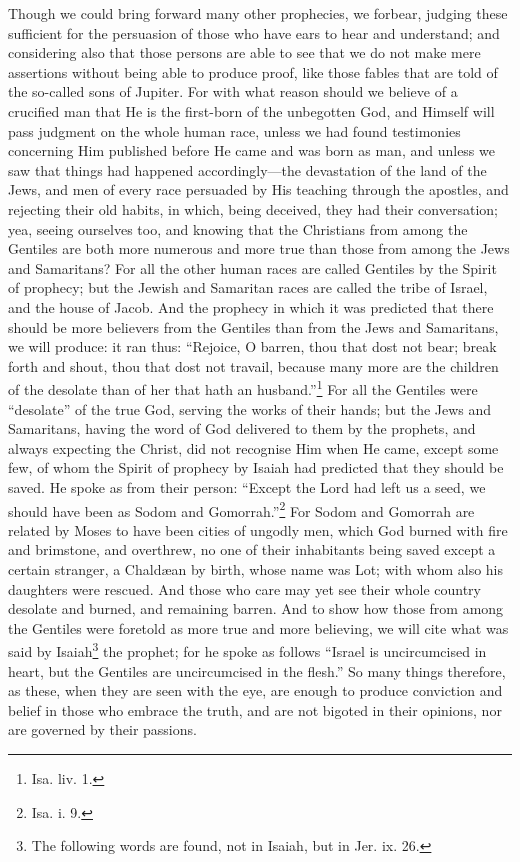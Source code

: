 Though we could bring forward many other prophecies, we forbear, judging these sufficient for the persuasion of those who have ears to hear and understand; and considering also that those persons are able to see that we do not make mere assertions without being able to produce proof, like those fables that are told of the so-called sons of Jupiter. For with what reason should we believe of a crucified man that He is the first-born of the unbegotten God, and Himself will pass judgment on the whole human race, unless we had found testimonies concerning Him published before He came and was born as man, and unless we saw that things had happened accordingly—the devastation of the land of the Jews, and men of every race persuaded by His teaching through the apostles, and rejecting their old habits, in which, being deceived, they had their conversation; yea, seeing ourselves too, and knowing that the Christians from among the Gentiles are both more numerous and more true than those from among the Jews and Samaritans? For all the other human races are called Gentiles by the Spirit of prophecy; but the Jewish and Samaritan races are called the tribe of Israel, and the house of Jacob. And the prophecy in which it was predicted that there should be more believers from the Gentiles than from the Jews and Samaritans, we will produce: it ran thus: “Rejoice, O barren, thou that dost not bear; break forth and shout, thou that dost not travail, because many more are the children of the desolate than of her that hath an husband.”\footnote{Isa. liv. 1.} For all the Gentiles were “desolate” of the true God, serving the works of their hands; but the Jews and Samaritans, having the word of God delivered to them by the prophets, and always expecting the Christ, did not recognise Him when He came, except some few, of whom the Spirit of prophecy by Isaiah had predicted  that they should be saved. He spoke as from their person: “Except the Lord had left us a seed, we should have been as Sodom and Gomorrah.”\footnote{Isa. i. 9.} For Sodom and Gomorrah are related by Moses to have been cities of ungodly men, which God burned with fire and brimstone, and overthrew, no one of their inhabitants being saved except a certain stranger, a Chaldæan by birth, whose name was Lot; with whom also his daughters were rescued. And those who care may yet see their whole country desolate and burned, and remaining barren. And to show how those from among the Gentiles were foretold as more true and more believing, we will cite what was said by Isaiah\footnote{The following words are found, not in Isaiah, but in Jer. ix. 26.} the prophet; for he spoke as follows “Israel is uncircumcised in heart, but the Gentiles are uncircumcised in the flesh.” So many things therefore, as these, when they are seen with the eye, are enough to produce conviction and belief in those who embrace the truth, and are not bigoted in their opinions, nor are governed by their passions.

